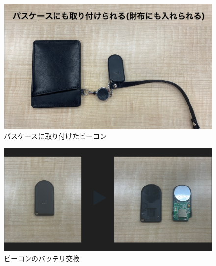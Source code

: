 \begin{figure}[H]
  \begin{center}
    \includegraphics[width=150mm]{image/beaconForpass.jpg}
    \caption{パスケースに取り付けたビーコン}
    \label{fig:beaconforpass}
  \end{center}
\end{figure}

\begin{figure}[H]
  \begin{center}
    \includegraphics[width=150mm]{image/batchange.png}
    \caption{ビーコンのバッテリ交換}
    \label{fig:batchange}
  \end{center}
\end{figure}

